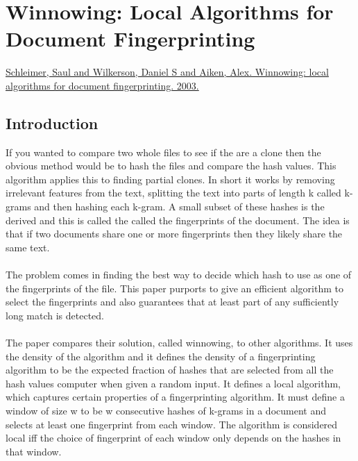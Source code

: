 \section{Winnowing: Local Algorithms for Document Fingerprinting}
\href{http://theory.stanford.edu/~aiken/publications/papers/sigmod03.pdf}{Schleimer, Saul and Wilkerson, Daniel S and Aiken, Alex. Winnowing: local algorithms for document fingerprinting. 2003.}
\subsection{Introduction}
If you wanted to compare two whole files to see if the are a clone then the obvious method would be to hash the files and compare the hash values. This algorithm applies this to finding partial clones. In short it works by removing irrelevant features from the text, splitting the text into parts of length k called k-grams and then hashing each k-gram. A small subset of these hashes is the derived and this is called the called the fingerprints of the document. The idea is that if two documents share one or more fingerprints then they likely share the same text.\\\\
The problem comes in finding the best way to decide which hash to use as one of the fingerprints of the file. This paper purports to give an efficient algorithm to select the fingerprints and also guarantees that at least part of any sufficiently long match is detected. \\\\
The paper compares their solution, called winnowing, to other algorithms. It uses the density of the algorithm and it defines the density of a fingerprinting algorithm to be the expected fraction of hashes that are selected from all the hash values computer when given a random input. It defines a local algorithm, which captures certain properties of a fingerprinting algorithm. It must define a window of size w to be w consecutive hashes of k-grams in a document and selects at least one fingerprint from each window. The algorithm is considered local iff the choice of fingerprint of each window only depends on the hashes in that window.
